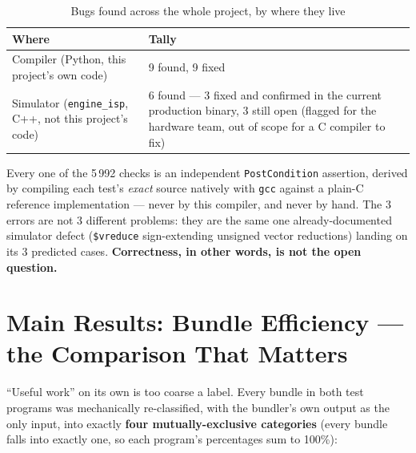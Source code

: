 \documentclass[11pt,a4paper]{article}
\begin{document}
\begin{table}[h]
\centering
\caption{Bugs found across the whole project, by where they live}
\begin{tabular}{@{}p{6.0cm}p{6.0cm}@{}}
\toprule
Where & Tally \\
\midrule
Compiler (Python, this project's own code) & 9 found, 9 fixed \\
Simulator (\texttt{engine\_isp}, C++, not this project's code) & 6 found --- 3 fixed and
  confirmed in the current production binary, 3 still open (flagged for the hardware
  team, out of scope for a C compiler to fix) \\
\bottomrule
\end{tabular}
\end{table}

Every one of the 5\,992 checks is an independent \texttt{PostCondition} assertion, derived
by compiling each test's \emph{exact} source natively with \texttt{gcc} against a
plain-C reference implementation --- never by this compiler, and never by hand. The 3
errors are not 3 different problems: they are the same one already-documented simulator
defect (\texttt{\$vreduce} sign-extending unsigned vector reductions) landing on its 3
predicted cases. \textbf{Correctness, in other words, is not the open question.}

\section{Main Results: Bundle Efficiency --- the Comparison That Matters}
\label{sec:efficiency}

``Useful work'' on its own is too coarse a label. Every bundle in both test programs was
mechanically re-classified, with the bundler's own output as the only input, into exactly
\textbf{four mutually-exclusive categories} (every bundle falls into exactly one, so each
program's percentages sum to 100\%):
\end{document}
